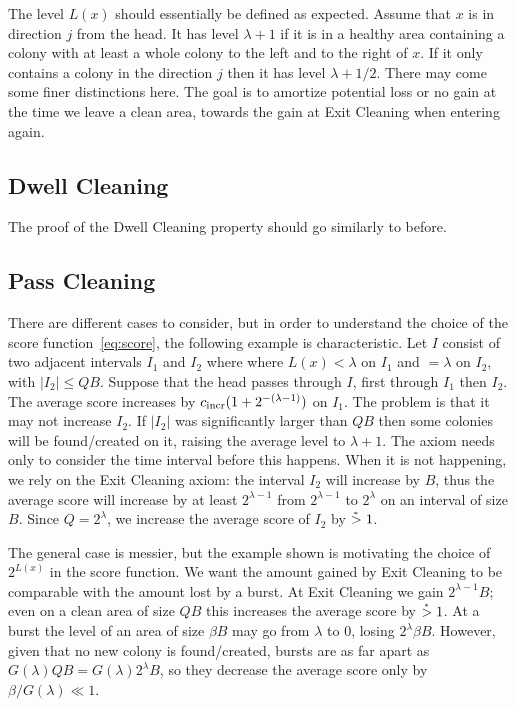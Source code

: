 \documentclass[12pt]{memoir}
\renewcommand{\le}{\leq}
\def\B{B}
\newcommand{\cns}[1]{c_{\textrm{\upshape #1}}}
\newcommand{\cIncr}{\cns{incr}}
\begin{document}
The level \( L(x) \) should essentially be defined as expected.
Assume that \( x \) is in direction \( j \) from the head.
It has level \( \lambda+1 \)
if it is in a healthy area containing a colony with at least a whole colony to the left and to the right
of \( x \).
If it only contains a colony in the direction \( j \) then it has level \( \lambda+1/2 \).
There may come some finer distinctions here.
The goal is to amortize potential loss or no gain at the time we leave a clean
area, towards the gain at Exit Cleaning when entering again.


\subsection{Dwell Cleaning}

The proof of the Dwell Cleaning property should go similarly to before.


\subsection{Pass Cleaning}

There are different cases  to consider, but in order to understand the choice of the
score function~\eqref{eq:score}, the following example is characteristic.
Let \( I \) consist of two adjacent intervals \( I_{1} \) and \(  I_{2} \) where  
where \( L(x)<\lambda \) on \( I_{1} \) and \( =\lambda \) on \( I_{2} \), with
\( |I_{2}|\le Q\B \).
Suppose that the head passes through \( I \), first through \( I_{1} \) then \( I_{2} \).
The average score increases by \( \cIncr(1+2^{-(\lambda-1)}) \) on \( I_{1} \).
The problem is that it may not increase \( I_{2} \).
If \( |I_{2}| \) was significantly larger than \( Q\B \) then some colonies will be
found/created on it, raising the average level to \( \lambda+1 \).
The axiom needs only to consider the time interval before this happens.
When it is not happening, we rely on the Exit Cleaning axiom: the interval \( I_{2} \)
will increase by \( \B \), thus the average score will increase by at least \( 2^{\lambda-1} \)
from \( 2^{\lambda-1} \) to \( 2^{\lambda} \) on an interval of size \( \B \).
Since \( Q=2^{\lambda} \), we increase the average score of \( I_{2} \) by \( \stackrel{{}_*}{>} 1 \).

The general case is messier, but the example shown is motivating the choice of \( 2^{L(x)} \) in
the score function.
We want the amount gained by Exit Cleaning to be
comparable with the amount lost by a burst.
At Exit Cleaning we gain \( 2^{\lambda-1}\B \); even on a clean area of size \( Q\B \)
this increases the average score by \( \stackrel{{}_*}{>} 1 \).
At a burst the level of an area of size \( \beta\B \) may go from \( \lambda \) to 0,
losing \( 2^{\lambda}\beta\B \).
However, given that no new colony is found/created, bursts are as far apart as 
\( G(\lambda)Q\B =G(\lambda)2^{\lambda}\B \), so they decrease the average score 
only by \( \beta/G(\lambda)\ll 1 \).
\end{document}
